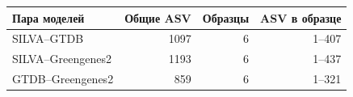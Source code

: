 \begin{tabular}{lrrr}
\toprule
Пара моделей & Общие ASV & Образцы & ASV в образце \\
\midrule
SILVA--GTDB & 1097 & 6 & 1--407 \\
SILVA--Greengenes2 & 1193 & 6 & 1--437 \\
GTDB--Greengenes2 & 859 & 6 & 1--321 \\
\bottomrule
\end{tabular}
